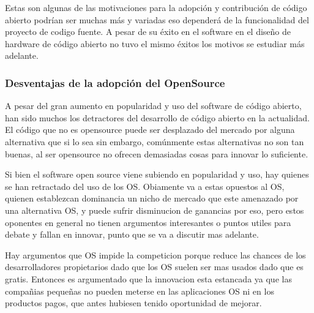  Estas son algunas de las motivaciones para la adopción y contribución de código abierto podrían ser muchas más y variadas eso dependerá de la funcionalidad del proyecto de codigo fuente. A pesar de su éxito en el software en el diseño de hardware de código abierto  no tuvo el mismo éxitos los motivos se estudiar más adelante.

\subsubsection{Desventajas de la adopción del OpenSource}

A pesar del gran aumento en popularidad y uso del software de código abierto, han sido muchos los detractores del desarrollo de código abierto en la actualidad. 
El código que no es opensource puede ser desplazado del mercado por alguna alternativa que si lo sea sin embargo, comúnmente estas alternativas no son tan buenas, al ser opensource no ofrecen demasiadas cosas para innovar lo suficiente.

Si bien el software open source viene subiendo en popularidad y uso, hay quienes se han retractado del uso de los OS. Obiamente va a estas opuestos al OS, quienen establezcan dominancia un nicho de mercado que este amenazado por una alternativa OS, y puede sufrir disminucion de ganancias por eso, pero estos oponentes en general no tienen argumentos interesantes o puntos utiles para debate y fallan en innovar, punto que se va a discutir mas adelante.

Hay argumentos que OS impide la competicion porque reduce las chances de los desarrolladores propietarios dado que los OS suelen ser mas usados dado que es gratis. Entonces es argumentado que la innovacion esta estancada ya que las compañias pequeñas no pueden meterse en las aplicaciones OS ni en los productos pagos, que antes hubiesen tenido oportunidad de mejorar.

